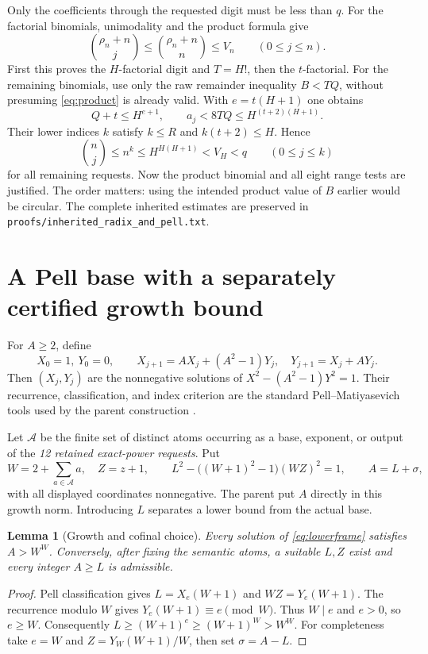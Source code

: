 \documentclass[10pt,letterpaper]{article}
\newtheorem{lemma}[theorem]{Lemma}
\theoremstyle{remark}\newtheorem{remark}[theorem]{Remark}
\newcommand{\file}[1]{\texttt{\nolinkurl{#1}}}
\begin{document}
Only the coefficients through the requested digit must be less than $q$.
For the factorial binomials, unimodality and the product formula give
\[
 \binom{\rho_n+n}{j}\le\binom{\rho_n+n}{n}\le V_n
 \qquad(0\le j\le n).
\]
First this proves the $H$-factorial digit and $T=H!$, then the $t$-factorial.
For the remaining binomials, use only the raw remainder inequality
$B<TQ$, without presuming \eqref{eq:product} is already valid. With
$e=t(H+1)$ one obtains
\[
 Q+t\le H^{e+1},\qquad
 a_j<8TQ\le H^{(t+2)(H+1)}.
\]
Their lower indices $k$ satisfy $k\le R$ and $k(t+2)\le H$. Hence
\[
 \binom{n}{j}\le n^k\le H^{H(H+1)}<V_H<q
 \qquad(0\le j\le k)
\]
for all remaining requests. Now the product binomial and all eight range
tests are justified. The order matters: using the intended product value
of $B$ earlier would be circular. The complete inherited estimates are
preserved in \file{proofs/inherited_radix_and_pell.txt}.

\section{A Pell base with a separately certified growth bound}
\label{sec:cofinal}

For $A\ge2$, define
\[
 X_0=1,\ Y_0=0,\qquad
 X_{j+1}=AX_j+(A^2-1)Y_j,\quad Y_{j+1}=X_j+AY_j.
\]
Then $(X_j,Y_j)$ are the nonnegative solutions of
$X^2-(A^2-1)Y^2=1$. Their recurrence, classification, and index
criterion are the standard Pell--Matiyasevich tools used by the parent
construction \cite{pell,carneiro}.

Let $\mathcal A$ be the finite set of distinct atoms occurring as a base,
exponent, or output of the \emph{12 retained exact-power requests}. Put
\begin{equation}\label{eq:lowerframe}
 W=2+\sum_{a\in\mathcal A}a,\quad Z=z+1,\qquad
 L^2-\bigl((W+1)^2-1\bigr)(WZ)^2=1,\qquad A=L+\sigma,
\end{equation}
with all displayed coordinates nonnegative. The parent put $A$ directly
in this growth norm. Introducing $L$ separates a lower bound from the
actual base.

\begin{lemma}[Growth and cofinal choice]\label{lem:growth}
Every solution of \eqref{eq:lowerframe} satisfies $A>W^W$.
Conversely, after fixing the semantic atoms, a suitable $L,Z$ exist and
every integer $A\ge L$ is admissible.
\end{lemma}
\begin{proof}
Pell classification gives $L=X_e(W+1)$ and $WZ=Y_e(W+1)$.
The recurrence modulo $W$ gives $Y_e(W+1)\equiv e\pmod W$.
Thus $W\mid e$ and $e>0$, so $e\ge W$. Consequently
$L\ge(W+1)^e\ge(W+1)^W>W^W$.
For completeness take $e=W$ and $Z=Y_W(W+1)/W$, then set $\sigma=A-L$.
\end{proof}
\end{document}
